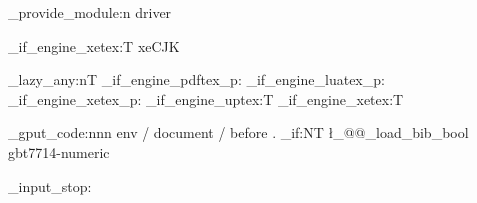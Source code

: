 \@@_provide_module:n { driver }

\sys_if_engine_xetex:T
  {  { xeCJK } }
\RequirePackage { graphicx, hyperref, lmodern, times, lipsum, zhlipsum }
\graphicspath { {./media} }
\hypersetup { hidelinks }
\bool_lazy_any:nT
  { \sys_if_engine_pdftex_p: \sys_if_engine_luatex_p: \sys_if_engine_xetex_p: }
  { \RequirePackage { microtype } }
\sys_if_engine_uptex:T
  {
  }
\sys_if_engine_xetex:T { \RequirePackage [ T1 ] { fontenc } }

\hook_gput_code:nnn { env / document / before } { . }
  {
    \bool_if:NT \l_@@_load_bib_bool
      {
        \RequirePackage [ sort, uppercasefamily = false ] { gbt7714 }
         { gbt7714-numeric }
      }
  }

\file_input_stop: